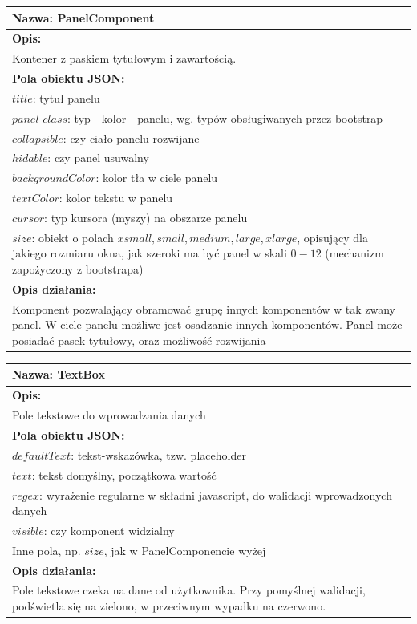 \documentclass[licencjacka]{pracamgr}
\begin{document}
\begin{tabularx}{\linewidth}{|X|}\hline
\textbf{Nazwa:}
PanelComponent
\\\hline
\textbf{Opis:}\\

Kontener z paskiem tytułowym i zawartością.\\
\hline
\textbf{Pola obiektu JSON:} \\
$title$: tytuł panelu\\
$panel\_class$: typ - kolor - panelu, wg. typów obsługiwanych przez bootstrap\\
$collapsible$: czy ciało panelu rozwijane\\
$hidable$: czy panel usuwalny\\
$backgroundColor$: kolor tła w ciele panelu\\
$textColor$: kolor tekstu w panelu\\
$cursor$: typ kursora (myszy) na obszarze panelu\\
$size$: obiekt o polach $xsmall, small, medium, large, xlarge$, opisujący dla jakiego rozmiaru okna, jak szeroki ma być panel w skali $0 - 12$ (mechanizm zapożyczony z bootstrapa)
\\\hline
\textbf{Opis działania:}\\
Komponent pozwalający obramować grupę innych komponentów w tak zwany panel. W ciele panelu możliwe jest osadzanie innych komponentów. Panel może posiadać pasek tytułowy, oraz możliwość rozwijania\\\hline

\end{tabularx}

\begin{tabularx}{\linewidth}{|X|}\hline
\textbf{Nazwa:}
TextBox
\\\hline
\textbf{Opis:}\\

Pole tekstowe do wprowadzania danych\\
\hline
\textbf{Pola obiektu JSON:} \\
$defaultText$: tekst-wskazówka, tzw. placeholder\\
$text$: tekst domyślny, początkowa wartość\\
$regex$: wyrażenie regularne w składni javascript, do walidacji wprowadzonych danych\\
$visible$: czy komponent widzialny\\
Inne pola, np. $size$, jak w PanelComponencie wyżej
\\\hline
\textbf{Opis działania:}\\
Pole tekstowe czeka na dane od użytkownika. Przy pomyślnej walidacji, podświetla się na zielono, w przeciwnym wypadku na czerwono.
\\\hline
\end{tabularx}
\end{document}
